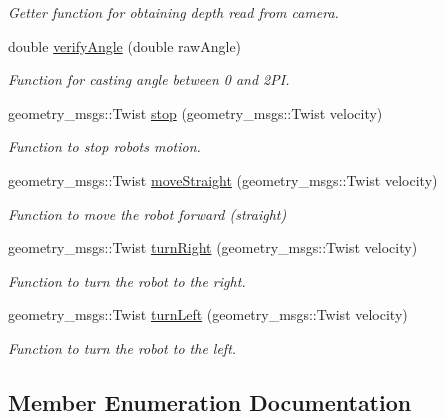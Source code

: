 \begin{DoxyCompactItemize}
\begin{DoxyCompactList}\small\item\em Getter function for obtaining depth read from camera. \end{DoxyCompactList}\item 
double \hyperlink{classStateMachine_ae489fcd0f460527700e3e4de549b5bf6}{verify\+Angle} (double raw\+Angle)
\begin{DoxyCompactList}\small\item\em Function for casting angle between 0 and 2\+PI. \end{DoxyCompactList}\item 
geometry\+\_\+msgs\+::\+Twist \hyperlink{classStateMachine_a78b255b75372d19a0f89634b268fe5da}{stop} (geometry\+\_\+msgs\+::\+Twist velocity)
\begin{DoxyCompactList}\small\item\em Function to stop robot\textquotesingle{}s motion. \end{DoxyCompactList}\item 
geometry\+\_\+msgs\+::\+Twist \hyperlink{classStateMachine_a6718533fefd33ee2b73f4ede6aa53e22}{move\+Straight} (geometry\+\_\+msgs\+::\+Twist velocity)
\begin{DoxyCompactList}\small\item\em Function to move the robot forward (straight) \end{DoxyCompactList}\item 
geometry\+\_\+msgs\+::\+Twist \hyperlink{classStateMachine_a1c3bfb5713c29ff24f440c2105308769}{turn\+Right} (geometry\+\_\+msgs\+::\+Twist velocity)
\begin{DoxyCompactList}\small\item\em Function to turn the robot to the right. \end{DoxyCompactList}\item 
geometry\+\_\+msgs\+::\+Twist \hyperlink{classStateMachine_ac1e4e9e429332b41f7c35300302f0c75}{turn\+Left} (geometry\+\_\+msgs\+::\+Twist velocity)
\begin{DoxyCompactList}\small\item\em Function to turn the robot to the left. \end{DoxyCompactList}\end{DoxyCompactItemize}


\subsection{Member Enumeration Documentation}
